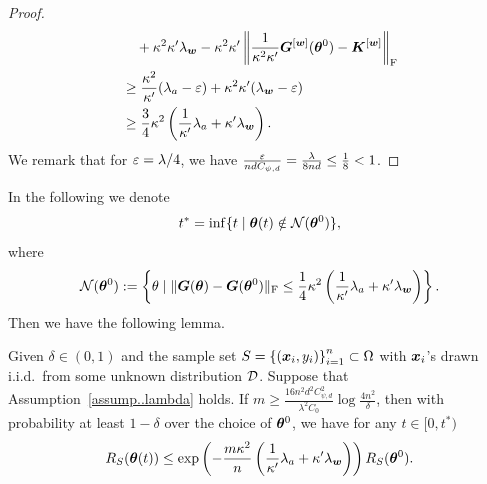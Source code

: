 \documentclass[twoside,11pt]{article}
\begin{document}
\begin{proof}
\begin{equation*}
\begin{aligned}
             & \quad + \kappa^2\kappa'\lambda_{\bm{w}} - \kappa^2\kappa'\left\lVert\frac{1}{\kappa^2\kappa'}\bm{G}^{[\bm{w}]}(\bm{\theta}^0) - \bm{K}^{[\bm{w}]}\right\rVert_\mathrm{F}     \\
             & \geq\frac{\kappa^2}{\kappa'}(\lambda_a-\varepsilon)+\kappa^2\kappa'(\lambda_{\bm{w}}-\varepsilon)                                                          \\
             & \geq\frac{3}{4}\kappa^2\left(\frac{1}{\kappa'}\lambda_a+\kappa'\lambda_{\bm{w}}\right).
        \end{aligned}
    \end{equation*}
    We remark that for $\varepsilon=\lambda/4$, we have $\frac{\varepsilon}{ndC_{\psi,d}}=\frac{\lambda}{8nd}\leq \frac{1}{8}< 1$.
\end{proof}

\noindent In the following we denote
\begin{equation}
    t^* = \inf\{t \mid \bm{\theta}(t)\notin \mathcal{N}(\bm{\theta}^0)\},
\end{equation}
where
\begin{equation}
    \mathcal{N}(\bm{\theta}^0) := \left\{\theta \mid \lVert\bm{G}(\bm{\theta}) - \bm{G}(\bm{\theta}^0)\rVert_\mathrm{F}\leq \frac{1}{4}\kappa^2\left(\frac{1}{\kappa'}\lambda_a+\kappa'\lambda_{\bm{w}}\right)\right\}.
\end{equation}
Then we have the following lemma.
\begin{lem}\label{lem:exp_RS}
    Given $\delta\in(0,1)$ and the sample set $S = {\{(\bm{x}_i, y_i)\}}_{i=1}^n\subset\Omega$ with $\bm{x}_i$'s drawn i.i.d.\ from some unknown distribution $\mathcal{D}$. Suppose that Assumption~\ref{assump..lambda} holds. If $m\geq\frac{16n^2d^2C_{\psi,d}^2}{\lambda^2C_0}\log\frac{4n^2}{\delta}$, then with probability at least $1-\delta$ over the choice of $\bm{\theta}^0$, we have for any $t\in[0, t^*)$
    \begin{equation}
        R_S(\bm{\theta}(t)) \leq \exp\left(-\frac{m\kappa^2}{n}\left(\frac{1}{\kappa'}\lambda_a+\kappa'\lambda_{\bm{w}}\right)\right)R_S(\bm{\theta}^0).
    \end{equation}
\end{lem}
\end{document}
